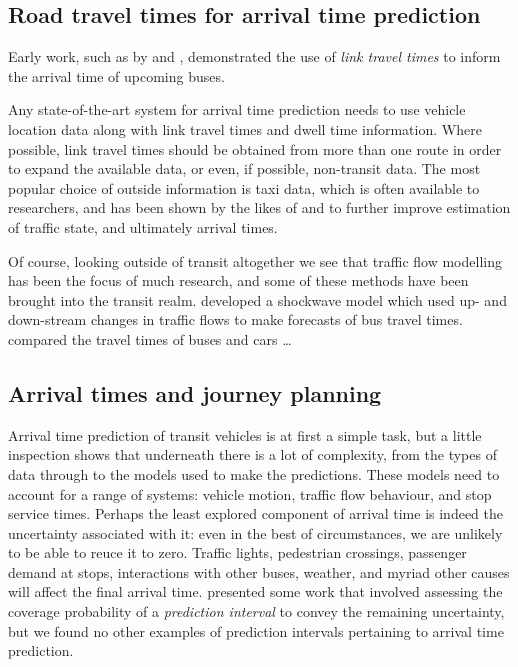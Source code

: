 \subsection{Road travel times for arrival time prediction}
\label{sec:intro_travel_time}

Early work, such as by \citet{Reinhoudt_1997} and \citet{Wall_1999}, demonstrated the use of \emph{link travel times} to inform the arrival time of upcoming buses.

Any state-of-the-art system for arrival time prediction needs to use \rt{} vehicle location data along with \rt{} link travel times and dwell time information. Where possible, link travel times should be obtained from more than one route in order to expand the available data, or even, if possible, non-transit data. The most popular choice of outside information is taxi data, which is often available to researchers, and has been shown by the likes of \citet{Xinghao_2013} and \citet{Ma_2019} to further improve estimation of traffic state, and ultimately arrival times.


Of course, looking outside of transit altogether we see that traffic flow modelling has been the focus of much research, and some of these methods have been brought into the transit realm. \citet{Julio_2016} developed a shockwave model which used up- and down-stream changes in traffic flows to make forecasts of bus travel times. \citet{Salonen_2013} compared the travel times of buses and cars \ldots


\subsection{Arrival times and journey planning}
\label{sec:intro_etas}


Arrival time prediction of transit vehicles is at first a simple task, but a little inspection shows that underneath there is a lot of complexity, from the types of data through to the models used to make the predictions. These models need to account for a range of systems: vehicle motion, traffic flow behaviour, and stop service times. Perhaps the least explored component of arrival time is indeed the uncertainty associated with it: even in the best of circumstances, we are unlikely to be able to reuce it to zero. Traffic lights, pedestrian crossings, passenger demand at stops, interactions with other buses, weather, and myriad other causes will affect the final arrival time. \citet{Mazloumi_2011} presented some work that involved assessing the coverage probability of a \emph{prediction interval} to convey the remaining uncertainty, but we found no other examples of prediction intervals pertaining to arrival time prediction.


